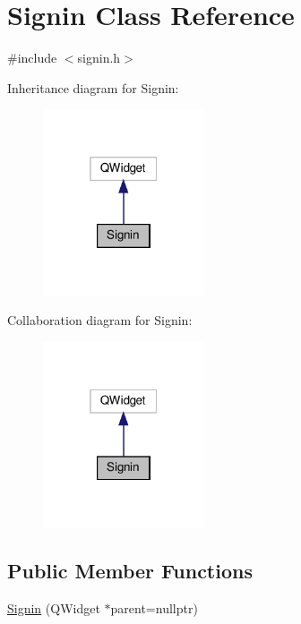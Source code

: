 \hypertarget{classSignin}{}\section{Signin Class Reference}
\label{classSignin}


{\ttfamily \#include $<$signin.\+h$>$}



Inheritance diagram for Signin\+:
\nopagebreak
\begin{figure}[H]
\begin{center}
\leavevmode
\includegraphics[width=135pt]{classSignin__inherit__graph}
\end{center}
\end{figure}


Collaboration diagram for Signin\+:
\nopagebreak
\begin{figure}[H]
\begin{center}
\leavevmode
\includegraphics[width=135pt]{classSignin__coll__graph}
\end{center}
\end{figure}
\subsection*{Public Member Functions}
\begin{DoxyCompactItemize}
\item 
\hyperlink{classSignin_a6c85b8b53a33ea42f467d7c09cf45388}{Signin} (Q\+Widget $\ast$parent=nullptr)
\end{DoxyCompactItemize}
